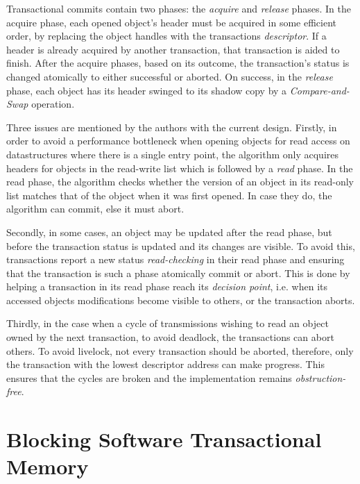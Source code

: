 Transactional commits contain two phases: the \textit{acquire} and \textit{release} phases. In the acquire phase, each opened object's header must be acquired in some efficient order, by replacing the object handles with the transactions \textit{descriptor}. If a header is already acquired by another transaction, that transaction is aided to finish\cite{OSTM}. After the acquire phases, based on its outcome, the transaction's status is changed atomically to either successful or aborted. On success, in the \textit{release} phase, each object has its header swinged to its shadow copy by a \textit{Compare-and-Swap} operation\cite{OSTM}.

Three issues are mentioned by the authors with the current design. Firstly, in order to avoid a performance bottleneck when opening objects for read access on datastructures where there is a single entry point, the algorithm only acquires headers for objects in the read-write list which is followed by a \textit{read} phase. In the read phase, the algorithm checks whether the version of an object in its read-only list matches that of the object when it was first opened. In case they do, the algorithm can commit, else it must abort\cite{OSTM}.

Secondly, in some cases, an object may be updated after the read phase, but before the transaction status is updated and its changes are visible. To avoid this, transactions report a new status \textit{read-checking} in their read phase and ensuring that the transaction is such a phase atomically commit or abort. This is done by helping a transaction in its read phase reach its \textit{decision point}, i.e. when its accessed objects modifications become visible to others, or the transaction aborts\cite{OSTM}.

Thirdly, in the case when a cycle of transmissions wishing to read an object owned by the next transaction, to avoid deadlock, the transactions can abort others. To avoid livelock, not every transaction should be aborted, therefore, only the transaction with the lowest descriptor address can make progress. This ensures that the cycles are broken and the implementation remains \textit{obstruction-free}\cite{OSTM}.

\section{Blocking Software Transactional Memory}

